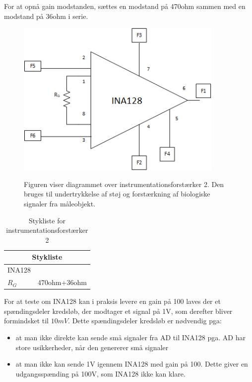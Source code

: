 For at opnå gain modstanden, sættes en modstand på 470ohm sammen med en modstand på 36ohm i serie.

\begin{figure}[H]
\centering
{\includegraphics[width=10cm]
{Figure/instrumentation2}}
\caption{Figuren viser diagrammet over instrumentationsforstærker 2. Den bruges til undertrykkelse af støj og forstærkning af biologiske signaler fra måleobjekt.}
\label{Fig:instrumentation2}
\end{figure} 



\begin{table}[H]
\centering
\caption{Stykliste for instrumentationsforstærker 2}
\label{Styklisteinstrumentationsforstarker2}
\begin{tabular}{|l|l|}
\hline
\multicolumn{2}{|c|}{\textbf{Stykliste}} \\ \hline
INA128             &                    \\ \hline
$R_{G}$            & 470ohm+36ohm            \\ \hline
\end{tabular}
\end{table}


For at teste om INA128 kan i praksis levere en gain på 100 laves der et spændingsdeler kredsløb, der modtager et signal på 1V, som derefter bliver formindsket til $10mV$. Dette spændingsdeler kredsløb er nødvendig pga:

\begin{itemize}
\item 	at man ikke direkte kan sende små signaler fra AD til INA128 pga. AD har store usikkerheder, når den genererer små signaler 
\item	at man ikke kan sende 1V igennem INA128 med gain på 100. Dette giver en udgangsspænding på 100V, som INA128 ikke kan klare. 

\end{itemize}

